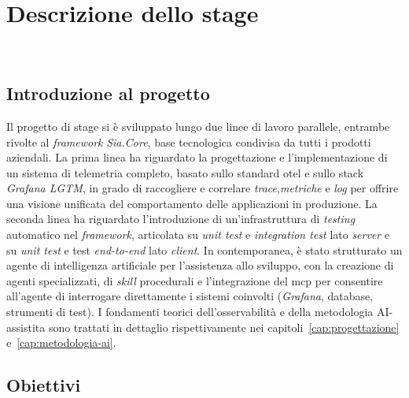 \chapter{Descrizione dello stage}
\label{cap:descrizione-stage}

\\

\section{Introduzione al progetto}

Il progetto di stage si è sviluppato lungo due linee di lavoro parallele, entrambe
rivolte al \emph{framework} \emph{Sia.Core}, base tecnologica condivisa da tutti i
prodotti aziendali. La prima linea ha riguardato la progettazione e l'implementazione
di un sistema di telemetria completo, basato sullo standard \gls{otel} e sullo stack
\emph{Grafana LGTM}, in grado di raccogliere e correlare \emph{trace},\emph{metriche} e
\emph{log} per offrire una visione unificata del comportamento delle applicazioni in
produzione. La seconda linea ha riguardato l'introduzione di un'infrastruttura di
\emph{testing} automatico nel \emph{framework}, articolata su \emph{unit test} e
\emph{integration test} lato \emph{server} e su \emph{unit test} e test
\emph{end-to-end} lato \emph{client}. In contemporanea, è stato strutturato
un agente di intelligenza artificiale per l'assistenza allo sviluppo, con la
creazione di agenti specializzati, di \emph{skill} procedurali e l'integrazione del
\gls{mcp} per consentire all'agente di interrogare direttamente i sistemi coinvolti
(\emph{Grafana}, database, strumenti di test). I fondamenti teorici dell'osservabilità
e della metodologia AI-assistita sono trattati in dettaglio rispettivamente nei
capitoli~\ref{cap:progettazione} e~\ref{cap:metodologia-ai}.

\section{Obiettivi}

